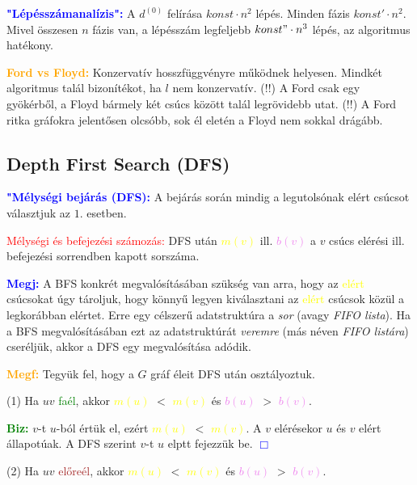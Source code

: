 \documentclass[../szamtud.tex]{subfiles}
\begin{document}
        \textcolor{blue}{\textbf{"Lépésszámanalízis":}} A $d^{(0)}$ felírása $konst \cdot n^2$ lépés. Minden fázis $konst' \cdot n^2$. Mivel összesen $n$ fázis van, a lépésszám legfeljebb $konst" \cdot n^3$ lépés, az algoritmus hatékony.

        \textcolor{orange}{\textbf{Ford vs Floyd:}} Konzervatív hosszfüggvényre működnek helyesen. Mindkét algoritmus talál bizonítékot, ha $l$ nem konzervatív. (!!) A Ford csak egy gyökérből, a Floyd bármely két csúcs között talál legrövidebb utat. (!!) A Ford ritka gráfokra jelentősen olcsóbb, sok él eletén a Floyd nem sokkal drágább.

    \subsection{Depth First Search (DFS)}

        \textcolor{blue}{\textbf{"Mélységi bejárás (DFS):}} A bejárás során mindig a legutolsónak elért csúcsot választjuk az $\boxed{1.}$ esetben.

        \textcolor{red}{Mélységi és befejezési számozás:} DFS után \textcolor{yellow}{$m(v)$} ill. \textcolor{violet}{$b(v)$} a $v$ csúcs elérési ill. befejezési sorrendben kapott sorszáma.

        \textcolor{blue}{\textbf{Megj:}} A BFS konkrét megvalósításában szükség van arra, hogy az \textcolor{yellow}{elért} csúcsokat úgy tároljuk, hogy könnyű legyen kiválasztani az \textcolor{yellow}{elért} csúcsok közül a legkorábban elértet. Erre egy célszerű adatstruktúra a \textit{sor} (avagy \textit{FIFO lista}). Ha a BFS megvalósításában ezt az adatstruktúrát \textit{veremre} (más néven \textit{FIFO listára}) cseréljük, akkor a DFS egy megvalósítása adódik.

        \textcolor{orange}{\textbf{Megf:}} Tegyük fel, hogy a $G$ gráf éleit DFS után osztályoztuk. 
        
        (1) Ha $uv$ \textcolor{green}{faél}, akkor \textcolor{yellow}{$m(u)$} $<$ \textcolor{yellow}{$m(v)$} és \textcolor{violet}{$b(u)$} $>$ \textcolor{violet}{$b(v)$}.

        \textcolor{green}{\textbf{Biz:}} $v$-t $u$-ból értük el, ezért \textcolor{yellow}{$m(u)$} $<$ \textcolor{yellow}{$m(v)$}. A $v$ elérésekor $u$ és $v$ elért állapotúak. A DFS szerint $v$-t $u$ elptt fejezzük be.  \textcolor{blue}{$\Box$} 

        (2) Ha $uv$ \textcolor{brown}{előreél}, akkor \textcolor{yellow}{$m(u)$} $<$ \textcolor{yellow}{$m(v)$} és \textcolor{violet}{$b(u)$} $>$ \textcolor{violet}{$b(v)$}.
\end{document}
